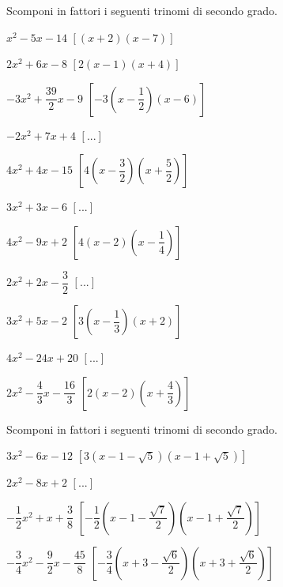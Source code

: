 \begin{esercizio}[\Ast]
 \label{ese:3.84}
Scomponi in fattori i seguenti trinomi di secondo grado.
\begin{multicols}{2}
\begin{enumeratea}
\item\(x^{2}-5 x-14\) \hfill\(\left[(x + 2) (x-7)\right]\)
\item\(2 x^{2} + 6 x-8\) \hfill\(\left[2 (x-1) (x + 4)\right]\)
\item\(- 3 x^{2} + \dfrac{39}{2} x-9\) 
 \hfill\(\left[-3 \left(x-\dfrac{1}{2} \right) (x-6)\right]\)
\item\(- 2 x^{2} + 7 x + 4\) \hfill\(\left[...\right]\)
\item\(4 x^{2} + 4 x-15\) 
 \hfill\(\left[4 \left(x-\dfrac{3}{2} \right) 
         \left(x + \dfrac{5}{2} \right)\right]\)
\item\(3 x^{2} + 3 x-6\) \hfill\(\left[...\right]\)
\item\(4 x^{2}-9 x + 2\) 
 \hfill\(\left[4 (x-2) \left(x-\dfrac{1}{4} \right)\right]\)
\item\(2 x^{2} + 2 x - \dfrac{3}{2}\) \hfill\(\left[...\right]\)
\item\(3 x^{2} + 5 x - 2\) 
 \hfill\(\left[3 \left(x-\dfrac{1}{3} \right) (x + 2)\right]\)
\item\(4 x^{2}-24 x + 20\) 
 \hfill\(\left[...\right]\)
\item\(2 x^{2}-\dfrac{4}{3} x - \dfrac{16}{3}\) 
 \hfill\(\left[2 (x-2) \left(x + \dfrac{4}{3} \right)\right]\)
\end{enumeratea}
\end{multicols}
\end{esercizio}

\begin{esercizio}[\Ast]
 \label{ese:3.87}
Scomponi in fattori i seguenti trinomi di secondo grado.
\begin{enumeratea}
\item\(3 x^{2}-6 x-12\) 
 \hfill\(\left[3 \left(x-1-\sqrt{5} \right) 
         \left(x-1 + \sqrt{5} \right)\right]\)
\item\(2 x^{2}-8 x + 2\) 
 \hfill\(\left[...\right]\)
\item\(- \dfrac{1}{2} x^{2} + x + \dfrac{3}{8}\) 
 \hfill\(\left[- \dfrac{1}{2} \left(x-1-\dfrac{\sqrt{7}}{2} \right) 
         \left(x- 1 + \dfrac{\sqrt{7}}{2} \right)\right]\)
\item\(- \dfrac{3}{4} x^{2}-\dfrac{9}{2} x - \dfrac{45}{8}\) 
 \hfill\(\left[- \dfrac{3}{4} \left(x + 3-\dfrac{\sqrt{6}}{2} \right) 
         \left(x+ 3 + \dfrac{\sqrt{6}}{2} \right)\right]\)
\end{enumeratea}
\end{esercizio}

